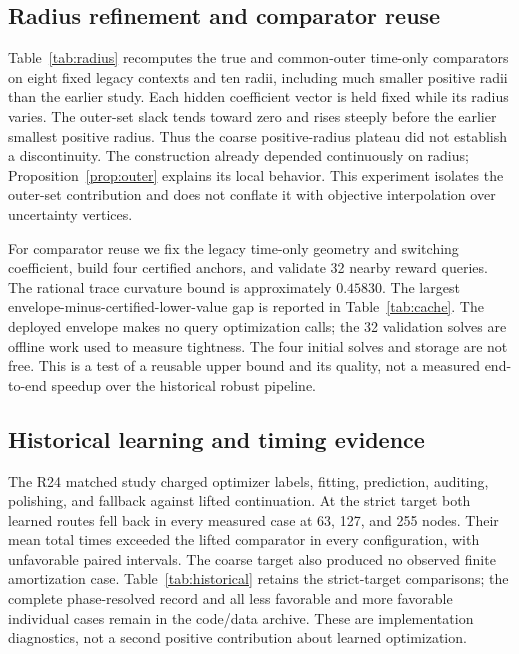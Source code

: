 \documentclass[11pt,letterpaper]{article}
\theoremstyle{definition}\newtheorem{assumption}[theorem]{Assumption}
\begin{document}
\subsection{Radius refinement and comparator reuse}
Table~\ref{tab:radius} recomputes the true and common-outer time-only comparators on eight fixed legacy contexts and ten radii, including much smaller positive radii than the earlier study. Each hidden coefficient vector is held fixed while its radius varies. The outer-set slack tends toward zero and rises steeply before the earlier smallest positive radius. Thus the coarse positive-radius plateau did not establish a discontinuity. The construction already depended continuously on radius; Proposition~\ref{prop:outer} explains its local behavior. This experiment isolates the outer-set contribution and does not conflate it with objective interpolation over uncertainty vertices.


For comparator reuse we fix the legacy time-only geometry and switching coefficient, build four certified anchors, and validate 32 nearby reward queries. The rational trace curvature bound is approximately $0.45830$. The largest envelope-minus-certified-lower-value gap is reported in Table~\ref{tab:cache}. The deployed envelope makes no query optimization calls; the 32 validation solves are offline work used to measure tightness. The four initial solves and storage are not free. This is a test of a reusable upper bound and its quality, not a measured end-to-end speedup over the historical robust pipeline.




\subsection{Historical learning and timing evidence}
The R24 matched study charged optimizer labels, fitting, prediction, auditing, polishing, and fallback against lifted continuation. At the strict target both learned routes fell back in every measured case at 63, 127, and 255 nodes. Their mean total times exceeded the lifted comparator in every configuration, with unfavorable paired intervals. The coarse target also produced no observed finite amortization case. Table~\ref{tab:historical} retains the strict-target comparisons; the complete phase-resolved record and all less favorable and more favorable individual cases remain in the code/data archive. These are implementation diagnostics, not a second positive contribution about learned optimization.
\end{document}
